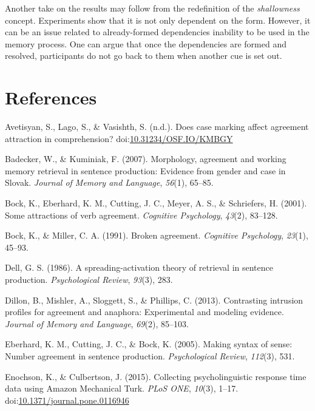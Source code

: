 \documentclass[doc]{apa6}
\begin{document}
Another take on the results may follow from the redefinition of the \emph{shallowness} concept. Experiments show that it is not only dependent on the form. However, it can be an issue related to already-formed dependencies inability to be used in the memory process. One can argue that once the dependencies are formed and resolved, participants do not go back to them when another cue is set out.

\hypertarget{references}{%
\section*{References}\label{references}}

\hypertarget{refs}{}
\leavevmode\hypertarget{ref-AvetisyanEtAl:2019}{}%
Avetisyan, S., Lago, S., \& Vasishth, S. (n.d.). Does case marking affect agreement attraction in comprehension? doi:\href{https://doi.org/10.31234/OSF.IO/KMBGY}{10.31234/OSF.IO/KMBGY}

\leavevmode\hypertarget{ref-BadeckerKuminiak:2007}{}%
Badecker, W., \& Kuminiak, F. (2007). Morphology, agreement and working memory retrieval in sentence production: Evidence from gender and case in Slovak. \emph{Journal of Memory and Language}, \emph{56}(1), 65--85.

\leavevmode\hypertarget{ref-Bock2001}{}%
Bock, K., Eberhard, K. M., Cutting, J. C., Meyer, A. S., \& Schriefers, H. (2001). Some attractions of verb agreement. \emph{Cognitive Psychology}, \emph{43}(2), 83--128.

\leavevmode\hypertarget{ref-Bock1991}{}%
Bock, K., \& Miller, C. A. (1991). Broken agreement. \emph{Cognitive Psychology}, \emph{23}(1), 45--93.

\leavevmode\hypertarget{ref-Dell1986}{}%
Dell, G. S. (1986). A spreading-activation theory of retrieval in sentence production. \emph{Psychological Review}, \emph{93}(3), 283.

\leavevmode\hypertarget{ref-Dillon2013}{}%
Dillon, B., Mishler, A., Sloggett, S., \& Phillips, C. (2013). Contrasting intrusion profiles for agreement and anaphora: Experimental and modeling evidence. \emph{Journal of Memory and Language}, \emph{69}(2), 85--103.

\leavevmode\hypertarget{ref-Eberhard2005}{}%
Eberhard, K. M., Cutting, J. C., \& Bock, K. (2005). Making syntax of sense: Number agreement in sentence production. \emph{Psychological Review}, \emph{112}(3), 531.

\leavevmode\hypertarget{ref-EnochsonCulbertson:2015}{}%
Enochson, K., \& Culbertson, J. (2015). Collecting psycholinguistic response time data using Amazon Mechanical Turk. \emph{PLoS ONE}, \emph{10}(3), 1--17. doi:\href{https://doi.org/10.1371/journal.pone.0116946}{10.1371/journal.pone.0116946}
\end{document}
